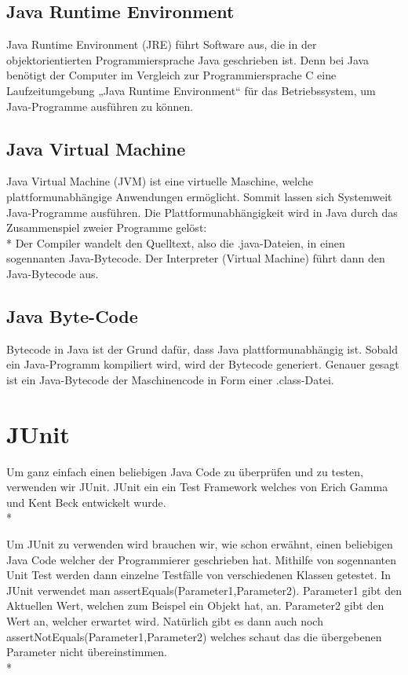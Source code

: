 \subsection{Java Runtime Environment }
\author{David Ignjatovic} 

Java Runtime Environment (JRE) führt Software aus, die in der objektorientierten Programmiersprache Java geschrieben ist. 
Denn bei Java benötigt der Computer im Vergleich zur Programmiersprache C eine Laufzeitumgebung „Java Runtime Environment“ für das Betriebssystem, um Java-Programme ausführen zu können. \cite{JRE}

\subsection{Java Virtual Machine}
\author{David Ignjatovic} 

Java Virtual Machine (JVM) ist eine virtuelle Maschine, welche plattformunabhängige Anwendungen ermöglicht. Sommit lassen sich Systemweit Java-Programme ausführen.
Die Plattformunabhängigkeit wird in Java durch das Zusammenspiel zweier Programme gelöst: \\*
Der Compiler wandelt den Quelltext, also die .java-Dateien, in einen sogennanten Java-Bytecode. Der Interpreter (Virtual Machine) führt dann den Java-Bytecode aus. \cite{JVM}

\subsection{Java Byte-Code}
\author{David Ignjatovic} 

Bytecode in Java ist der Grund dafür, dass Java plattformunabhängig ist. Sobald ein Java-Programm kompiliert wird, wird der Bytecode generiert. 
Genauer gesagt ist ein Java-Bytecode der Maschinencode in Form einer .class-Datei.

\section{JUnit}
\author{David Ignjatovic} 

Um ganz einfach einen beliebigen Java Code zu überprüfen und zu testen, verwenden wir JUnit. JUnit ein ein Test Framework welches von Erich Gamma und Kent Beck
entwickelt wurde. \\*

Um JUnit zu verwenden wird brauchen wir, wie schon erwähnt, einen beliebigen Java Code welcher der Programmierer geschrieben hat. Mithilfe von sogennanten Unit Test 
werden dann einzelne Testfälle von verschiedenen Klassen getestet. In JUnit verwendet man assertEquals(Parameter1,Parameter2). Parameter1 gibt den Aktuellen Wert, welchen zum Beispel 
ein Objekt hat, an. Parameter2 gibt den Wert an, welcher erwartet wird. Natürlich gibt es dann auch noch assertNotEquals(Parameter1,Parameter2) welches schaut das die übergebenen 
Parameter nicht übereinstimmen. \\*


